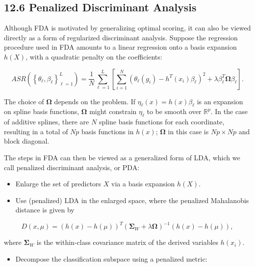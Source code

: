\documentclass[10pt]{article}
\begin{document}
\subsection*{12.6 Penalized Discriminant Analysis}
Although FDA is motivated by generalizing optimal scoring, it can also be viewed directly as a form of regularized discriminant analysis. Suppose the regression procedure used in FDA amounts to a linear regression onto a basis expansion $h(X)$, with a quadratic penalty on the coefficients:


\begin{equation*}
A S R\left(\left\{\theta_{\ell}, \beta_{\ell}\right\}_{\ell=1}^{L}\right)=\frac{1}{N} \sum_{\ell=1}^{L}\left[\sum_{i=1}^{N}\left(\theta_{\ell}\left(g_{i}\right)-h^{T}\left(x_{i}\right) \beta_{\ell}\right)^{2}+\lambda \beta_{\ell}^{T} \boldsymbol{\Omega} \beta_{\ell}\right] . \tag{12.57}
\end{equation*}


The choice of $\boldsymbol{\Omega}$ depends on the problem. If $\eta_{\ell}(x)=h(x) \beta_{\ell}$ is an expansion on spline basis functions, $\boldsymbol{\Omega}$ might constrain $\eta_{\ell}$ to be smooth over $\mathbb{R}^{p}$. In the case of additive splines, there are $N$ spline basis functions for each coordinate, resulting in a total of $N p$ basis functions in $h(x)$; $\boldsymbol{\Omega}$ in this case is $N p \times N p$ and block diagonal.

The steps in FDA can then be viewed as a generalized form of LDA, which we call penalized discriminant analysis, or PDA:

\begin{itemize}
  \item Enlarge the set of predictors $X$ via a basis expansion $h(X)$.
  \item Use (penalized) LDA in the enlarged space, where the penalized Mahalanobis distance is given by
\end{itemize}


\begin{equation*}
D(x, \mu)=(h(x)-h(\mu))^{T}\left(\boldsymbol{\Sigma}_{W}+\lambda \boldsymbol{\Omega}\right)^{-1}(h(x)-h(\mu)), \tag{12.58}
\end{equation*}


where $\boldsymbol{\Sigma}_{W}$ is the within-class covariance matrix of the derived variables $h\left(x_{i}\right)$.

\begin{itemize}
  \item Decompose the classification subspace using a penalized metric:
\end{itemize}
\end{document}

